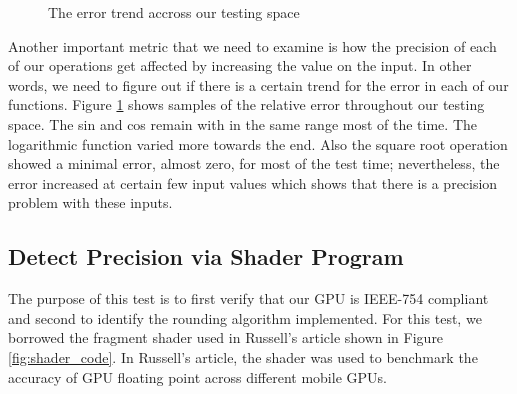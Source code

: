 \begin{figure}[!tbh]
 \centering  
  \caption{The error trend accross our testing space }
   \label{fig:errr}
\end{figure}

Another important metric that we need to examine is how the precision of each of our operations get affected by increasing the value on the input. In other words, we need to figure out if there is a certain trend for the error in each of our functions. Figure \ref{fig:errr} shows samples of the relative error throughout our testing space. The sin and cos remain with in the same range most of the time. The logarithmic function varied more towards the end. Also the square root operation showed a minimal error, almost zero, for most of the test time; nevertheless, the error increased at certain few input values which shows that there is a precision problem with these inputs.

\subsection{Detect Precision via Shader Program}
The purpose of this test is to first verify that our GPU is IEEE-754 compliant and second to identify the rounding algorithm implemented. For this test, we borrowed the fragment shader used in Russell's article \cite{stuart2013mobile} shown in Figure \ref{fig:shader_code}. In Russell's article, the shader was used to benchmark the accuracy of GPU floating point across different mobile GPUs. 

